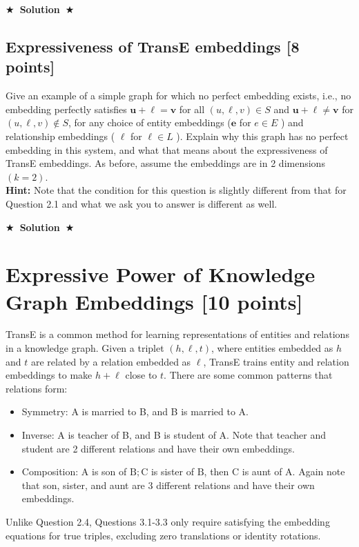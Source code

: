 \documentclass{article}
\numberwithin{figure}{section}
\newcommand{\Solution}[1]{%
    {%
        \medskip
        \color{red}
        \bf $\bigstar$~\sf\textbf{Solution}~$\bigstar$ \sf
        #1
    }
    \bigskip
}
\begin{document}
\Solution{}

\subsection{Expressiveness of TransE embeddings [8 points]}
Give an example of a simple graph for which no perfect embedding exists, i.e., no embedding perfectly satisfies $\mathbf{u}+\boldsymbol{\ell}=\mathbf{v}$ for all $(u, \ell, v) \in S$ and $\mathbf{u}+\boldsymbol{\ell} \neq \mathbf{v}$ for $(u, \ell, v) \notin S$, for any choice of entity embeddings ($\mathbf{e}$ for $e \in E$ ) and relationship embeddings ( $\boldsymbol{\ell}$ for $\ell \in L$ ). Explain why this graph has no perfect embedding in this system, and what that means about the expressiveness of TransE embeddings. As before, assume the embeddings are in 2 dimensions $(k=2)$.\\
\textbf{Hint:} Note that the condition for this question is slightly different from that for Question 2.1 and what we ask you to answer is different as well.

\Solution{}

\section{Expressive Power of Knowledge Graph Embeddings [10 points]}
TransE is a common method for learning representations of entities and relations in a knowledge graph. Given a triplet $(h, \ell, t)$, where entities embedded as $h$ and $t$ are related by a relation embedded as $\ell$, TransE trains entity and relation embeddings to make $h+\ell$ close to $t$. There are some common patterns that relations form:
\begin{itemize}
    \item Symmetry: A is married to B, and B is married to A.
    \item Inverse: A is teacher of B, and B is student of A. Note that teacher and student are 2 different relations and have their own embeddings.
    \item Composition: $\mathrm{A}$ is son of $\mathrm{B} ; \mathrm{C}$ is sister of $\mathrm{B}$, then $\mathrm{C}$ is aunt of $\mathrm{A}$. Again note that son, sister, and aunt are 3 different relations and have their own embeddings.
\end{itemize}
Unlike Question 2.4, Questions 3.1-3.3 only require satisfying
the embedding equations for true triples, excluding zero
translations or identity rotations.
\end{document}
